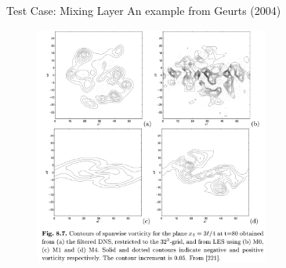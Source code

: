 \begin{frame}{Test Case: Mixing Layer}
An example from Geurts (2004)
\begin{figure}
\includegraphics[width=0.685\textwidth]{compare7}	
\end{figure}
\end{frame}

